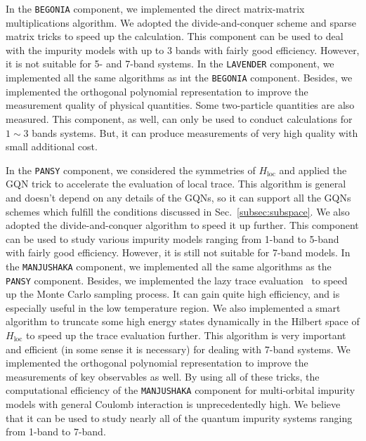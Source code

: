 In the \texttt{BEGONIA} component, we implemented the direct matrix-matrix multiplications algorithm. We adopted the divide-and-conquer scheme and sparse matrix tricks to speed up the calculation. This component can be used to deal with the impurity models with up to $3$ bands with fairly good efficiency. However, it is not suitable for 5- and 7-band systems. In the \texttt{LAVENDER} component, we implemented all the same algorithms as int the \texttt{BEGONIA} component. Besides, we implemented the orthogonal polynomial representation to improve the measurement quality of physical quantities. Some two-particle quantities are also measured. This component, as well, can only be used to conduct calculations for $1 \sim 3$ bands systems. But, it can produce measurements of very high quality with small additional cost.

In the \texttt{PANSY} component, we considered the symmetries of $H_{\text{loc}}$ and applied the GQN trick to accelerate the evaluation of local trace. This algorithm is general and doesn't depend on any details of the GQNs, so it can support all the GQNs schemes which fulfill the conditions discussed in Sec.~\ref{subsec:subspace}. We also adopted the divide-and-conquer algorithm to speed it up further. This component can be used to study various impurity models ranging from 1-band to 5-band with fairly good efficiency. However, it is still not suitable for 7-band models. In the \texttt{MANJUSHAKA} component, we implemented all the same algorithms as the \texttt{PANSY} component. Besides, we implemented the lazy trace evaluation~\cite{arXiv:1403.7214} to speed up the Monte Carlo sampling process. It can gain quite high efficiency, and is especially useful in the low temperature region. We also implemented a smart algorithm to truncate some high energy states dynamically in the Hilbert space of $H_{\text{loc}}$ to speed up the trace evaluation further. This algorithm is very important and efficient (in some sense it is necessary) for dealing with 7-band systems. We implemented the orthogonal polynomial representation to improve the measurements of key observables as well. By using all of these tricks, the computational efficiency of the \texttt{MANJUSHAKA} component for multi-orbital impurity models with general Coulomb interaction is unprecedentedly high. We believe that it can be used to study nearly all of the quantum impurity systems ranging from 1-band to 7-band.

